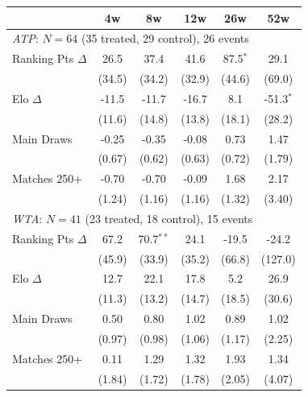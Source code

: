 \begin{tabular}{l*{5}{c}}
\toprule
 & 4w & 8w & 12w & 26w & 52w \\
\midrule
\multicolumn{6}{l}{\textit{ATP}: $N = 64$ (35 treated, 29 control), 26 events} \\
  Ranking Pts $\Delta$ & 26.5 & 37.4 & 41.6 & 87.5$^{*}$ & 29.1 \\
  & (34.5) & (34.2) & (32.9) & (44.6) & (69.0) \\[0.3em]
  Elo $\Delta$ & -11.5 & -11.7 & -16.7 & 8.1 & -51.3$^{*}$ \\
  & (11.6) & (14.8) & (13.8) & (18.1) & (28.2) \\[0.3em]
  Main Draws & -0.25 & -0.35 & -0.08 & 0.73 & 1.47 \\
  & (0.67) & (0.62) & (0.63) & (0.72) & (1.79) \\[0.3em]
  Matches 250+ & -0.70 & -0.70 & -0.09 & 1.68 & 2.17 \\
  & (1.24) & (1.16) & (1.16) & (1.32) & (3.40) \\[0.3em]
\midrule
\multicolumn{6}{l}{\textit{WTA}: $N = 41$ (23 treated, 18 control), 15 events} \\
  Ranking Pts $\Delta$ & 67.2 & 70.7$^{**}$ & 24.1 & -19.5 & -24.2 \\
  & (45.9) & (33.9) & (35.2) & (66.8) & (127.0) \\[0.3em]
  Elo $\Delta$ & 12.7 & 22.1 & 17.8 & 5.2 & 26.9 \\
  & (11.3) & (13.2) & (14.7) & (18.5) & (30.6) \\[0.3em]
  Main Draws & 0.50 & 0.80 & 1.02 & 0.89 & 1.02 \\
  & (0.97) & (0.98) & (1.06) & (1.17) & (2.25) \\[0.3em]
  Matches 250+ & 0.11 & 1.29 & 1.32 & 1.93 & 1.34 \\
  & (1.84) & (1.72) & (1.78) & (2.05) & (4.07) \\[0.3em]
\midrule
\bottomrule
\end{tabular}

